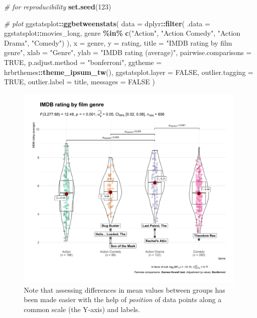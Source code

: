 \documentclass[
]{article}
\newenvironment{Shaded}{\begin{snugshade}}{\end{snugshade}}
\newcommand{\CommentTok}[1]{\textcolor[rgb]{0.56,0.35,0.01}{\textit{#1}}}
\newcommand{\DataTypeTok}[1]{\textcolor[rgb]{0.13,0.29,0.53}{#1}}
\newcommand{\DecValTok}[1]{\textcolor[rgb]{0.00,0.00,0.81}{#1}}
\newcommand{\KeywordTok}[1]{\textcolor[rgb]{0.13,0.29,0.53}{\textbf{#1}}}
\newcommand{\NormalTok}[1]{#1}
\newcommand{\OperatorTok}[1]{\textcolor[rgb]{0.81,0.36,0.00}{\textbf{#1}}}
\newcommand{\OtherTok}[1]{\textcolor[rgb]{0.56,0.35,0.01}{#1}}
\newcommand{\StringTok}[1]{\textcolor[rgb]{0.31,0.60,0.02}{#1}}
\begin{document}
\begin{Shaded}
\begin{Highlighting}[]
\CommentTok{\# for reproducibility}
\KeywordTok{set.seed}\NormalTok{(}\DecValTok{123}\NormalTok{)}

\CommentTok{\# plot}
\NormalTok{ggstatsplot}\OperatorTok{::}\KeywordTok{ggbetweenstats}\NormalTok{(}
  \DataTypeTok{data =}\NormalTok{ dplyr}\OperatorTok{::}\KeywordTok{filter}\NormalTok{(}
    \DataTypeTok{.data =}\NormalTok{ ggstatsplot}\OperatorTok{::}\NormalTok{movies\_long,}
\NormalTok{    genre }\OperatorTok{\%in\%}\StringTok{ }\KeywordTok{c}\NormalTok{(}\StringTok{"Action"}\NormalTok{, }\StringTok{"Action Comedy"}\NormalTok{, }\StringTok{"Action Drama"}\NormalTok{, }\StringTok{"Comedy"}\NormalTok{)}
\NormalTok{  ),}
  \DataTypeTok{x =}\NormalTok{ genre,}
  \DataTypeTok{y =}\NormalTok{ rating,}
  \DataTypeTok{title =} \StringTok{"IMDB rating by film genre"}\NormalTok{,}
  \DataTypeTok{xlab =} \StringTok{"Genre"}\NormalTok{,}
  \DataTypeTok{ylab =} \StringTok{"IMDB rating (average)"}\NormalTok{,}
  \DataTypeTok{pairwise.comparisons =} \OtherTok{TRUE}\NormalTok{,}
  \DataTypeTok{p.adjust.method =} \StringTok{"bonferroni"}\NormalTok{,}
  \DataTypeTok{ggtheme =}\NormalTok{ hrbrthemes}\OperatorTok{::}\KeywordTok{theme\_ipsum\_tw}\NormalTok{(),}
  \DataTypeTok{ggstatsplot.layer =} \OtherTok{FALSE}\NormalTok{,}
  \DataTypeTok{outlier.tagging =} \OtherTok{TRUE}\NormalTok{,}
  \DataTypeTok{outlier.label =}\NormalTok{ title,}
  \DataTypeTok{messages =} \OtherTok{FALSE}
\NormalTok{)}
\end{Highlighting}
\end{Shaded}

\begin{figure}[H]
\includegraphics[width=1\linewidth]{./figures/paper-fig1-1} \caption{Note that assessing differences in mean values between groups has been made easier with the help of \textit{position} of data points along a common scale (the Y-axis) and labels.}\label{fig:fig1}
\end{figure}
\end{document}
